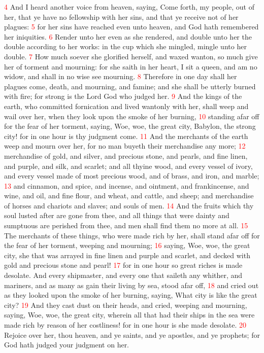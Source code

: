 \documentclass[12pt,twoside]{memoir}
\newcommand{\vnum}[1]{\textcolor{red}{\normalsize{#1}}}
\begin{document}
\vnum{4} And I heard another voice from heaven, saying, Come forth, my people, out of her, that ye have no fellowship with her sins, and that ye receive not of her plagues: 
\vnum{5} for her sins have reached even unto heaven, and God hath remembered her iniquities. 
\vnum{6} Render unto her even as she rendered, and double unto her the double according to her works: in the cup which she mingled, mingle unto her double. 
\vnum{7} How much soever she glorified herself, and waxed wanton, so much give her of torment and mourning: for she saith in her heart, I sit a queen, and am no widow, and shall in no wise see mourning. 
\vnum{8} Therefore in one day shall her plagues come, death, and mourning, and famine; and she shall be utterly burned with fire; for strong is the Lord God who judged her. 
\vnum{9} And the kings of the earth, who committed fornication and lived wantonly with her, shall weep and wail over her, when they look upon the smoke of her burning, 
\vnum{10} standing afar off for the fear of her torment, saying, Woe, woe, the great city, Babylon, the strong city! for in one hour is thy judgment come. 
\vnum{11} And the merchants of the earth weep and mourn over her, for no man buyeth their merchandise any more; 
\vnum{12} merchandise of gold, and silver, and precious stone, and pearls, and fine linen, and purple, and silk, and scarlet; and all thyine wood, and every vessel of ivory, and every vessel made of most precious wood, and of brass, and iron, and marble; 
\vnum{13} and cinnamon, and spice, and incense, and ointment, and frankincense, and wine, and oil, and fine flour, and wheat, and cattle, and sheep; and merchandise of horses and chariots and slaves; and souls of men. 
\vnum{14} And the fruits which thy soul lusted after are gone from thee, and all things that were dainty and sumptuous are perished from thee, and men shall find them no more at all. 
\vnum{15} The merchants of these things, who were made rich by her, shall stand afar off for the fear of her torment, weeping and mourning; 
\vnum{16} saying, Woe, woe, the great city, she that was arrayed in fine linen and purple and scarlet, and decked with gold and precious stone and pearl! 
\vnum{17} for in one hour so great riches is made desolate. And every shipmaster, and every one that saileth any whither, and mariners, and as many as gain their living by sea, stood afar off, 
\vnum{18} and cried out as they looked upon the smoke of her burning, saying, What city is like the great city? 
\vnum{19} And they cast dust on their heads, and cried, weeping and mourning, saying, Woe, woe, the great city, wherein all that had their ships in the sea were made rich by reason of her costliness! for in one hour is she made desolate. 
\vnum{20} Rejoice over her, thou heaven, and ye saints, and ye apostles, and ye prophets; for God hath judged your judgment on her.
\end{document}
